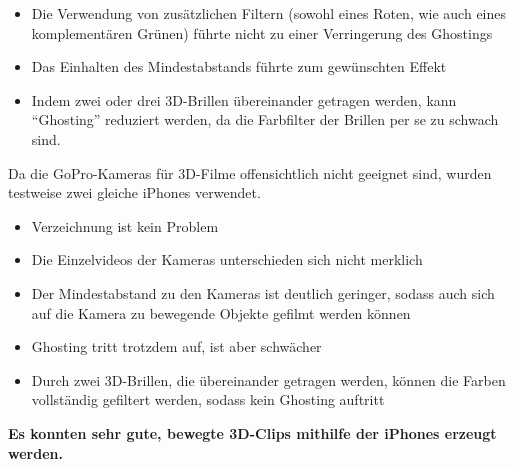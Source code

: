 \begin{itemize}
\item Die Verwendung von zusätzlichen Filtern (sowohl eines Roten, wie auch eines komplementären Grünen) führte nicht zu einer Verringerung des Ghostings
\item Das Einhalten des Mindestabstands führte zum gewünschten Effekt
\item Indem zwei oder drei 3D-Brillen übereinander getragen werden, kann \enquote{Ghosting} reduziert werden, da die Farbfilter der Brillen per se zu schwach sind.
\end{itemize}


Da die GoPro-Kameras für 3D-Filme offensichtlich nicht geeignet sind, wurden testweise zwei gleiche iPhones verwendet.

\begin{itemize}
\item Verzeichnung ist kein Problem
\item Die Einzelvideos der Kameras unterschieden sich nicht merklich
\item Der Mindestabstand zu den Kameras ist deutlich geringer, sodass auch sich auf die Kamera zu bewegende Objekte gefilmt werden können
\item Ghosting tritt trotzdem auf, ist aber schwächer
\item Durch zwei 3D-Brillen, die übereinander getragen werden, können die Farben vollständig gefiltert werden, sodass kein Ghosting auftritt
\end{itemize}

\textbf{Es konnten sehr gute, bewegte 3D-Clips mithilfe der iPhones erzeugt werden.}


